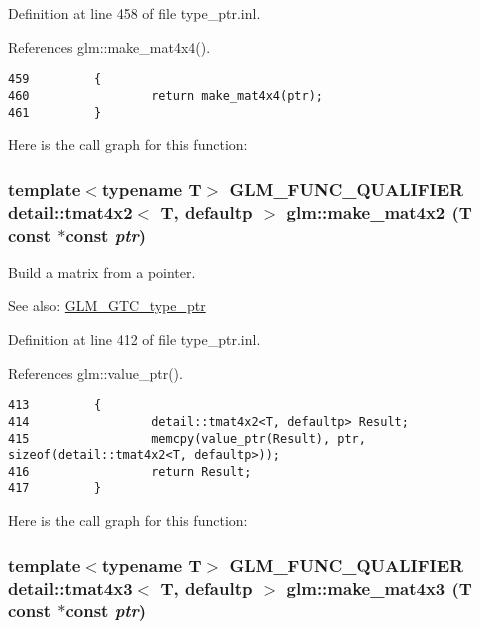 Definition at line 458 of file type\_\-ptr.inl.

References glm::make\_\-mat4x4().

\begin{Code}\begin{verbatim}459         {
460                 return make_mat4x4(ptr);
461         }
\end{verbatim}
\end{Code}




Here is the call graph for this function:\hypertarget{group__gtc__type__ptr_gc253e8157af1e4ec366c80d4bd90cbb2}{
\subsubsection[make\_\-mat4x2]{\setlength{\rightskip}{0pt plus 5cm}template$<$typename T$>$ GLM\_\-FUNC\_\-QUALIFIER detail::tmat4x2$<$ T, defaultp $>$ glm::make\_\-mat4x2 (T const $\ast$const  {\em ptr})}}
\label{group__gtc__type__ptr_gc253e8157af1e4ec366c80d4bd90cbb2}


Build a matrix from a pointer. \begin{Desc}
\item[See also:]\hyperlink{group__gtc__type__ptr}{GLM\_\-GTC\_\-type\_\-ptr} \end{Desc}


Definition at line 412 of file type\_\-ptr.inl.

References glm::value\_\-ptr().

\begin{Code}\begin{verbatim}413         {
414                 detail::tmat4x2<T, defaultp> Result;
415                 memcpy(value_ptr(Result), ptr, sizeof(detail::tmat4x2<T, defaultp>));
416                 return Result;
417         }
\end{verbatim}
\end{Code}




Here is the call graph for this function:\hypertarget{group__gtc__type__ptr_gc375314134d9b3736395a4eda2602590}{
\subsubsection[make\_\-mat4x3]{\setlength{\rightskip}{0pt plus 5cm}template$<$typename T$>$ GLM\_\-FUNC\_\-QUALIFIER detail::tmat4x3$<$ T, defaultp $>$ glm::make\_\-mat4x3 (T const $\ast$const  {\em ptr})}}
\label{group__gtc__type__ptr_gc375314134d9b3736395a4eda2602590}


